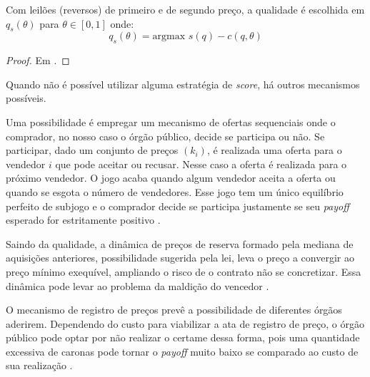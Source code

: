 \begin{lema}
	Com leilões (reversos) de primeiro e de segundo preço, a qualidade é escolhida em $q_s(\theta)$ para $\theta \in [0, 1]$ onde:
	\begin{equation}
		q_s(\theta) = \text{argmax } s(q) - c(q, \theta)
	\end{equation}
\end{lema}
\begin{proof}
	Em \citet{Che1993}.
\end{proof}

Quando não é possível utilizar alguma estratégia de \emph{score}, há outros mecanismos possíveis.

Uma possibilidade é empregar um mecanismo de ofertas sequenciais onde o comprador, no nosso caso o órgão público, decide se participa ou não. Se participar, dado um conjunto de preços $(k_i)$, é realizada uma oferta para o vendedor $i$ que pode aceitar ou recusar. Nesse caso a oferta é realizada para o próximo vendedor. O jogo acaba quando algum vendedor aceita a oferta ou quando se esgota o número de vendedores. Esse jogo tem um único equilíbrio perfeito de subjogo e o comprador decide se participa justamente se seu \emph{payoff} esperado for estritamente positivo \citet{Manelli1995}.

Saindo da qualidade, a dinâmica de preços de reserva formado pela mediana de aquisições anteriores, possibilidade sugerida pela lei, leva o preço a convergir ao preço mínimo exequível, ampliando o risco de o contrato não se concretizar. Essa dinâmica pode levar ao problema da maldição do vencedor \citet{Signor2022}.

O mecanismo de registro de preços prevê a possibilidade de diferentes órgãos aderirem. Dependendo do custo para viabilizar a ata de registro de preço, o órgão público pode optar por não realizar o certame dessa forma, pois uma quantidade excessiva de caronas pode tornar o \emph{payoff} muito baixo se comparado ao custo de sua realização \citet{barbosa2013}.